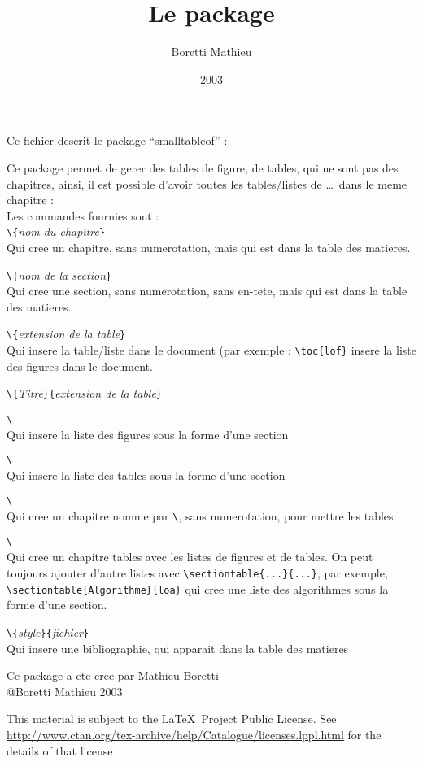 \documentclass[pagesize=auto, fontsize=12pt, DIV=10, parskip=full, american, french]{scrartcl}
\title{Le package \pkg{smalltableof}}
\author{Boretti Mathieu }
\date{2003}
\makeatletter
\newcommand*{\pkg}[1]{\textsf{#1}}
\newcommand*{\cs}[1]{\texttt{\textbackslash#1}}
\newcommand*{\cmd}[1]{\cs{\expandafter\@gobble\string#1}}
\newcommand*{\meta}[1]{\textlangle\textsl{#1}\textrangle}
\newcommand*{\marg}[1]{\texttt{\{}\meta{#1}\texttt{\}}}
\makeatother
\begin{document}
\maketitle

Ce fichier descrit le package \enquote{\pkg{smalltableof}} :

Ce package permet de gerer des tables de figure, de tables, qui ne sont pas des chapitres, ainsi, il est possible d'avoir toutes les tables/listes de \dots\ dans le meme chapitre :\\
Les commandes fournies sont :\\
\cmd{\chapterNoNumber}\marg{nom du chapitre}\\
Qui cree un chapitre, sans numerotation, mais qui est dans la table des matieres.

\cmd{\sectionNoNumber}\marg{nom de la section}\\
Qui cree une section, sans numerotation, sans en-tete, mais qui est dans la table des matieres.

\cmd{\toc}\marg{extension de la table}\\
Qui insere la table/liste dans le document (par exemple : \verb|\toc{lof}| insere la liste des figures dans le document.

\cmd{\sectiontable}\marg{Titre}\marg{extension de la table}

\cmd{\sectiontableoffigure}\\
Qui insere la liste des figures sous la forme d'une section

\cmd{\sectiontableoftable}\\
Qui insere la liste des tables sous la forme d'une section

\cmd{\tablechapter}\\
Qui cree un chapitre nomme par \cmd{\tablesname}, sans numerotation, pour mettre les tables.

\begin{sloppypar}
  \cmd{\stdtables}\\
  Qui cree un chapitre tables avec les listes de figures et de tables. On peut toujours ajouter d'autre listes avec \verb|\sectiontable{...}{...}|, par exemple, \verb|\sectiontable{Algorithme}{loa}| qui cree une liste des algorithmes sous la forme d'une section.
\end{sloppypar}

\cmd{\mabibliographie}\marg{style}\marg{fichier}\\
Qui insere une bibliographie, qui apparait dans la table des matieres

Ce package a ete cree par Mathieu Boretti\\
@Boretti Mathieu 2003

This material is subject to the \LaTeX\ Project Public License. See \url{http://www.ctan.org/tex-archive/help/Catalogue/licenses.lppl.html} for the details of that license
\end{document}

